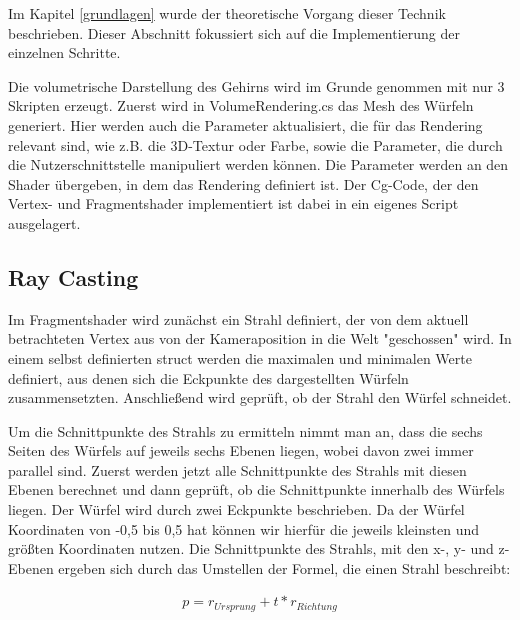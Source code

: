 Im Kapitel \ref{grundlagen} wurde der theoretische Vorgang dieser Technik beschrieben. Dieser Abschnitt fokussiert sich auf die Implementierung der einzelnen Schritte.

Die volumetrische Darstellung des Gehirns wird im Grunde genommen mit nur 3 Skripten erzeugt. Zuerst wird in VolumeRendering.cs das Mesh des Würfeln generiert. Hier werden auch die Parameter aktualisiert, die für das Rendering relevant sind, wie z.B. die 3D-Textur oder Farbe, sowie die Parameter, die durch die Nutzerschnittstelle manipuliert werden können. 
Die Parameter werden an den Shader übergeben, in dem das Rendering definiert ist. Der Cg-Code, der den Vertex- und Fragmentshader implementiert ist dabei in ein eigenes Script ausgelagert.

\subsection{Ray Casting}

Im Fragmentshader wird zunächst ein Strahl definiert, der von dem aktuell betrachteten Vertex aus von der Kameraposition in die Welt "geschossen" wird. In einem selbst definierten struct werden die maximalen und minimalen Werte definiert, aus denen sich die Eckpunkte des dargestellten Würfeln zusammensetzten. Anschließend wird geprüft, ob der Strahl den Würfel schneidet. 

Um die Schnittpunkte des Strahls zu ermitteln nimmt man an, dass die sechs Seiten des Würfels auf jeweils sechs Ebenen liegen, wobei davon zwei immer parallel sind. Zuerst werden jetzt alle Schnittpunkte des Strahls mit diesen Ebenen berechnet und dann geprüft, ob die Schnittpunkte innerhalb des Würfels liegen.
Der Würfel wird durch zwei Eckpunkte beschrieben. Da der Würfel Koordinaten von -0,5 bis 0,5 hat können wir hierfür die jeweils kleinsten und größten Koordinaten nutzen. 
Die Schnittpunkte des Strahls, mit den x-, y- und z-Ebenen ergeben sich durch das Umstellen der Formel, die einen Strahl beschreibt:

\begin{align}
p=r_{Ursprung}+t*r_{Richtung}
\end{align}

